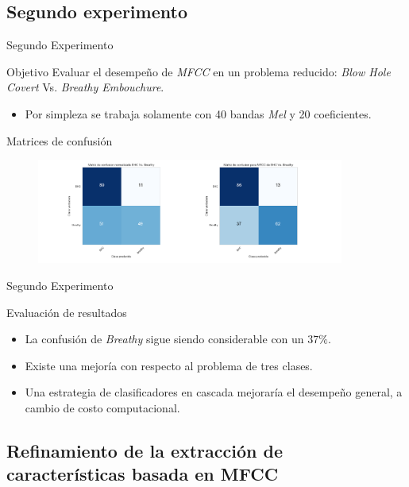 \documentclass[aspectratio=169]{beamer}
\begin{document}
\subsection{Segundo experimento}

\begin{frame}{Segundo Experimento}
\begin{block}{Objetivo}
Evaluar el desempeño de \textit{MFCC} en un problema reducido: \textit{Blow Hole Covert} Vs. \textit{Breathy Embouchure}.
\begin{itemize}
\item Por simpleza se trabaja solamente con 40 bandas \textit{Mel} y 20 coeficientes.
\end{itemize}
\end{block}
\begin{block}{Matrices de confusión}
\begin{figure}[H]
\begin{center}
\includegraphics[width=0.9\textwidth]{exp2_confusion} 
\end{center}
\end{figure}
\end{block}
\end{frame}

\begin{frame}{Segundo Experimento}
\begin{block}{Evaluación de resultados}
\begin{itemize}
\item La confusión de \textit{Breathy} sigue siendo considerable con un $37\%$.
\item Existe una mejoría con respecto al problema de tres clases.
\item Una estrategia de clasificadores en cascada mejoraría el desempeño general, a cambio de costo computacional.
\end{itemize}
\end{block}
\end{frame}

\subsection{Refinamiento de la extracción de características basada en MFCC}
\end{document}
